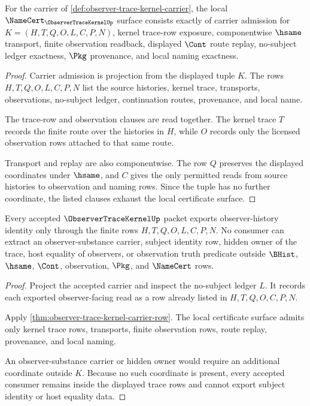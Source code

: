 \begin{theorem}
\label{thm:observer-trace-kernel-carrier-row}
For the carrier of \autoref{def:observer-trace-kernel-carrier}, the local $\NameCert_{\ObserverTraceKernelUp}$ surface consists exactly of carrier admission for $K=(H,T,Q,O,L,C,P,N)$, kernel trace-row exposure, componentwise $\hsame$ transport, finite observation readback, displayed $\Cont$ route replay, no-subject ledger exactness, $\Pkg$ provenance, and local naming exactness.
\end{theorem}
\begin{proof}
Carrier admission is projection from the displayed tuple $K$. The rows $H,T,Q,O,L,C,P,N$ list the source histories, kernel trace, transports, observations, no-subject ledger, continuation routes, provenance, and local name.

The trace-row and observation clauses are read together. The kernel trace $T$ records the finite route over the histories in $H$, while $O$ records only the licensed observation rows attached to that same route.

Transport and replay are also componentwise. The row $Q$ preserves the displayed coordinates under $\hsame$, and $C$ gives the only permitted reads from source histories to observation and naming rows. Since the tuple has no further coordinate, the listed clauses exhaust the local certificate surface.
\end{proof}

\begin{theorem}
\label{thm:observer-trace-kernel-no-subject-ledger}
Every accepted $\ObserverTraceKernelUp$ packet exports observer-history identity only through the finite rows $H,T,Q,O,L,C,P,N$. No consumer can extract an observer-substance carrier, subject identity row, hidden owner of the trace, host equality of observers, or observation truth predicate outside $\BHist$, $\hsame$, $\Cont$, observation, $\Pkg$, and $\NameCert$ rows.
\end{theorem}
\begin{proof}
Project the accepted carrier and inspect the no-subject ledger $L$. It records each exported observer-facing read as a row already listed in $H,T,Q,O,C,P,N$.

Apply \autoref{thm:observer-trace-kernel-carrier-row}. The local certificate surface admits only kernel trace rows, transports, finite observation rows, route replay, provenance, and local naming.

An observer-substance carrier or hidden owner would require an additional coordinate outside $K$. Because no such coordinate is present, every accepted consumer remains inside the displayed trace rows and cannot export subject identity or host equality data.
\end{proof}

